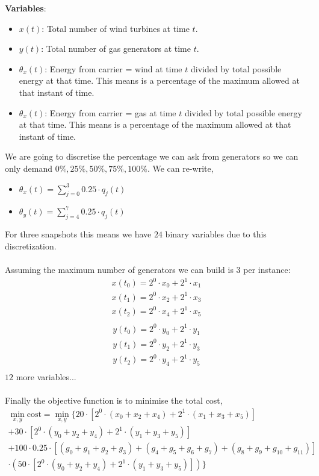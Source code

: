 \textbf{Variables}:
\begin{itemize}
    \item $x(t)$: Total number of wind turbines at time $t$.
    \item $y(t)$: Total number of gas generators at time $t$.
    \item $\theta_{x}(t)$: Energy from carrier = wind  at time $t$ divided by total possible energy at that time. This means is a percentage of the maximum allowed at that instant of time.
    \item $\theta_{x}(t)$: Energy from carrier = gas  at time $t$ divided by total possible energy at that time. This means is a percentage of the maximum allowed at that instant of time.
\end{itemize}
We are going to discretise the percentage we can ask from generators so we can only demand ${0\%,25\%,50\%,75\%,100\%}$. We can re-write,
\begin{itemize}
    \item $\theta_{x}(t) = \sum_{j=0}^{3}0.25\cdot q_{j}(t)$
    \item $\theta_{y}(t) = \sum_{j=4}^{7}0.25\cdot q_{j}(t)$
\end{itemize}
For three snapshots this means we have $24$ binary variables due to this discretization.\\\\
Assuming the maximum number of generators we can build is 3 per instance:
\begin{align}
    x(t_{0}) = 2^{0}\cdot x_{0} + 2^{1}\cdot x_{1} \\
    x(t_{1}) = 2^{0}\cdot x_{2} + 2^{1}\cdot x_{3} \\
    x(t_{2}) = 2^{0}\cdot x_{4} + 2^{1}\cdot x_{5} \\
\end{align}
\begin{align}
    y(t_{0}) = 2^{0}\cdot y_{0} + 2^{1}\cdot y_{1} \\
    y(t_{1}) = 2^{0}\cdot y_{2} + 2^{1}\cdot y_{3} \\
    y(t_{2}) = 2^{0}\cdot y_{4} + 2^{1}\cdot y_{5} \\
\end{align}
$12$ more variables...\\\\
Finally the objective function is to minimise the total cost,
\begin{align}
    \min_{x,y} \text{cost} = \min_{x,y}\{20\cdot\left[2^{0}\cdot\left(x_{0} + x_{2} + x_{4}\right) + 2^{1}\cdot\left(x_{1} + x_{3} + x_{5}\right) \right]\\
    + 30\cdot\left[2^{0}\cdot\left(y_{0} + y_{2} + y_{4}\right) + 2^{1}\cdot\left(y_{1} + y_{3} + y_{5}\right)\right]\\
    + 100\cdot 0.25 \cdot \left[\left(g_{0} + g_{1} + g_{2} + g_{3}\right) + \left(g_{4} + g_{5} + g_{6} + g_{7}\right) + \left(g_{8} + g_{9} + g_{10} + g_{11}\right)\right]\\
    \cdot\left(50\cdot \left[2^{0}\cdot\left(y_{0} + y_{2} + y_{4}\right) + 2^{1}\cdot\left(y_{1} + y_{3} + y_{5}\right)\right]\right)\}
\end{align}

